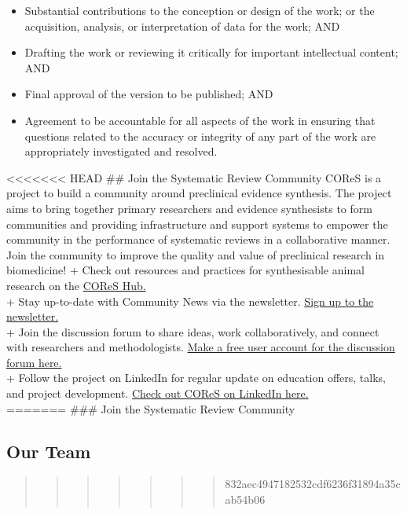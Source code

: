 \documentclass[
]{book}
\providecommand{\tightlist}{%
  \setlength{\itemsep}{0pt}\setlength{\parskip}{0pt}}
\begin{document}
\begin{itemize}
\tightlist
\item
  Substantial contributions to the conception or design of the work; or the acquisition, analysis, or interpretation of data for the work; AND
\item
  Drafting the work or reviewing it critically for important intellectual content; AND
\item
  Final approval of the version to be published; AND
\item
  Agreement to be accountable for all aspects of the work in ensuring that questions related to the accuracy or integrity of any part of the work are appropriately investigated and resolved.
\end{itemize}

\textless\textless\textless\textless\textless\textless\textless{} HEAD
\#\# Join the Systematic Review Community
COReS is a project to build a community around preclinical evidence synthesis. The project aims to bring together primary researchers and evidence synthesists to form communities and providing infrastructure and support systems to empower the community in the performance of systematic reviews in a collaborative manner. Join the community to improve the quality and value of preclinical research in biomedicine!
+ Check out resources and practices for synthesisable animal research on the \href{www.cores-hub.io}{COReS Hub.}\\
+ Stay up-to-date with Community News via the newsletter. \href{http://eepurl.com/h4hsMv}{Sign up to the newsletter.}\\
+ Join the discussion forum to share ideas, work collaboratively, and connect with researchers and methodologists. \href{www.cores.zulipchat.com}{Make a free user account for the discussion forum here.}\\
+ Follow the project on LinkedIn for regular update on education offers, talks, and project development. \href{https://www.linkedin.com/company/communities-for-open-research-synthesis/}{Check out COReS on LinkedIn here.}\\
=======
\#\#\# Join the Systematic Review Community

\subsection{Our Team}\label{our-team}

\begin{quote}
\begin{quote}
\begin{quote}
\begin{quote}
\begin{quote}
\begin{quote}
\begin{quote}
832aec4947182532cdf6236f31894a35cab54b06
\end{quote}
\end{quote}
\end{quote}
\end{quote}
\end{quote}
\end{quote}
\end{quote}
\end{document}
